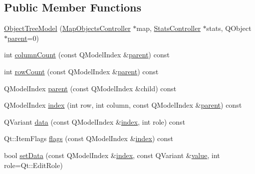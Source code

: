 \subsection*{Public Member Functions}
\begin{DoxyCompactItemize}
\item 
\mbox{\hyperlink{class_object_tree_model_a209079263ea8a71d94daed1ffe2cd48a}{Object\+Tree\+Model}} (\mbox{\hyperlink{class_map_objects_controller}{Map\+Objects\+Controller}} $\ast$map, \mbox{\hyperlink{class_stats_controller}{Stats\+Controller}} $\ast$stats, Q\+Object $\ast$\mbox{\hyperlink{class_object_tree_model_a040c443c3dfe7c4eeb2ba74fce0d2dae}{parent}}=0)
\item 
int \mbox{\hyperlink{class_object_tree_model_a05b2e971aab7fd39c9b10d71b1e43367}{column\+Count}} (const Q\+Model\+Index \&\mbox{\hyperlink{class_object_tree_model_a040c443c3dfe7c4eeb2ba74fce0d2dae}{parent}}) const
\item 
int \mbox{\hyperlink{class_object_tree_model_af8a2f187fa81897db0983e4a47d2e315}{row\+Count}} (const Q\+Model\+Index \&\mbox{\hyperlink{class_object_tree_model_a040c443c3dfe7c4eeb2ba74fce0d2dae}{parent}}) const
\item 
Q\+Model\+Index \mbox{\hyperlink{class_object_tree_model_a040c443c3dfe7c4eeb2ba74fce0d2dae}{parent}} (const Q\+Model\+Index \&child) const
\item 
Q\+Model\+Index \mbox{\hyperlink{class_object_tree_model_afc20c3ca6732ededf4de9d3e184b21ae}{index}} (int row, int column, const Q\+Model\+Index \&\mbox{\hyperlink{class_object_tree_model_a040c443c3dfe7c4eeb2ba74fce0d2dae}{parent}}) const
\item 
Q\+Variant \mbox{\hyperlink{class_object_tree_model_a927caf32b34220593af63cb3e0c77094}{data}} (const Q\+Model\+Index \&\mbox{\hyperlink{class_object_tree_model_afc20c3ca6732ededf4de9d3e184b21ae}{index}}, int role) const
\item 
Qt\+::\+Item\+Flags \mbox{\hyperlink{class_object_tree_model_aae7f151eec2e73541be301e04c525f02}{flags}} (const Q\+Model\+Index \&\mbox{\hyperlink{class_object_tree_model_afc20c3ca6732ededf4de9d3e184b21ae}{index}}) const
\item 
bool \mbox{\hyperlink{class_object_tree_model_a6c80b29fee10e7cb84c30975411ec524}{set\+Data}} (const Q\+Model\+Index \&\mbox{\hyperlink{class_object_tree_model_afc20c3ca6732ededf4de9d3e184b21ae}{index}}, const Q\+Variant \&\mbox{\hyperlink{diffusion_8cpp_a4b41795815d9f3d03abfc739e666d5da}{value}}, int role=Qt\+::\+Edit\+Role)
\item 

\end{DoxyCompactItemize}
